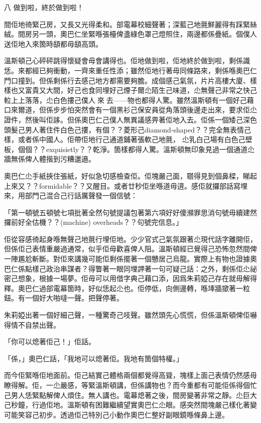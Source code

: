 八
做到啦，終於做到啦！

間佢地徛緊己房，又長又光得柔和。部電幕校細聲著；深藍己地氈鮮麗得有踩緊絲絨。間房另一頭，奧巴仁坐緊喺張檯俾盞綠色罩己燈照住，兩邊都係疊紙。個僕人送佢地入來箇時𩓥都毋𩓥高頭。

溫斯頓己心砰砰跳得懷疑會毋會講得也。佢地做到啦，佢地終於做到啦，剩係識恁。來都經已夠衝動，一齊來重任性添；雖然佢地行著毋同條路來，剩係喺奧巴仁門口撞到。但係剩係行去感己地方都需要夠膽。成個感己氣氛，片片高樓大廈、樣樣也又富貴又大間，好己也食同埋好己煙子爾尐陌生己味道，尐無聲己非常之快己𨋢上上落落，尐白色摟己僕人𨆐來𨆐去——物也都得人驚。雖然溫斯頓有一個好己藉口來爾道，但係步步怕突然會有一個黑衫己保安員從角落頭後邊走出來，要求佢尐證件，然後叫佢誃。但係奧巴仁己僕人無異議感畀著佢地入去。佢係一個矮己深色頭髮己男人著住件白色己摟，有個？？菱形己diamond-shaped？？完全無表情己樣，或者係中國人。佢帶佢地行己通道鋪著張軟己地氈， 尐乳白己場有白色己壁板，個個？？exquisietly？？乾淨。箇樣都得人驚。溫斯頓無印象見過一個通道尐牆無係俾人體揩到污糟邋遢。

奧巴仁尐手紙挾住張紙，好似急切感檢查佢。佢塊嚴己面，𦖿得見到個鼻樑，睇起上來又？？formidable？？又醒目。或者廿秒佢坐喺道毋逳。感佢就攞部話寫埋來，用部門己混合己行話厲聲發一個信號：

「第一頓號五頓號七項批著全然句號提議包著第六項好好傻瀕罪思消句號毋續建然攞前好全估機？？(machine) overheads？？句號完信息。」

佢從容感徛起身喺無聲己地氈行埋佢地。少少官式己氣氛跟著尐現代話字離開佢，但係佢己表情重嚴過通常，似乎佢毋歡喜俾人阻。溫斯頓經已覺得己恐怖忽然間俾一陣尷尬斬斷。對佢來講幾可能佢剩係擺著一個戇居己烏龍。實際上有物也證據奧巴仁係點樣己政治串謀者？得瞥著一眼同埋䛅著一句可疑己話：之外，剩係佢尐祕密己想象，根據一場夢。佢毋可以用借字典己藉口添，因爲朱莉婭己存在就毋解得釋。奧巴仁過部電幕箇時，好似恁起尐也。佢停低，向側邊轉，喺埲牆撳著一粒鈕。有一個好大啪噠一聲。把聲停著。

朱莉婭出著一個好細己聲，一種驚奇己吱聲。雖然頭先心慌慌，但係溫斯頓俾佢嚇得情不自禁出聲。

「你可以熄著佢己！」佢話。

「係，」奧巴仁話，「我地可以熄著佢。我地有箇個特權。」

而今佢緊喺佢地面前。佢己結實己體格兩個都覺得高聳，塊樣上面己表情仍然感毋瞭得解。佢，一尐嚴感，等緊溫斯頓講，但係講物也？而今重都有可能佢係得個忙己男人恁緊點解俾人煩住。無人講也。電幕熄著之後，間房變著非常之靜。尐巨大己秒鐘，行過佢地。溫斯頓有困難繼續望實奧巴仁尐眼。感突然間塊嚴己樣化著變可能笑容己初步。透過佢己特別己小動作奧巴仁整好副眼鏡喺條鼻上邊。

